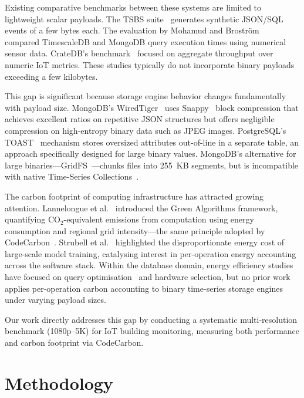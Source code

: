 \documentclass[conference]{IEEEtran}
\begin{document}
Existing comparative benchmarks between these systems are limited to lightweight scalar payloads. The TSBS suite~\cite{tsbs} generates synthetic JSON/SQL events of a few bytes each. The evaluation by Mohamud and Broström~\cite{diva_timescaledb_mongodb_eval} compared TimescaleDB and MongoDB query execution times using numerical sensor data. CrateDB's benchmark~\cite{cratedb_ts_benchmark} focused on aggregate throughput over numeric IoT metrics. These studies typically do not incorporate binary payloads exceeding a few kilobytes.

This gap is significant because storage engine behavior changes fundamentally with payload size. MongoDB's WiredTiger~\cite{mongodb_wiredtiger_storage} uses Snappy~\cite{google_snappy} block compression that achieves excellent ratios on repetitive JSON structures but offers negligible compression on high-entropy binary data such as JPEG images. PostgreSQL's TOAST~\cite{postgresql_toast_docs} mechanism stores oversized attributes out-of-line in a separate table, an approach specifically designed for large binary values. MongoDB's alternative for large binaries---GridFS~\cite{mongodb_gridfs}---chunks files into 255~KB segments, but is incompatible with native Time-Series Collections~\cite{mongodb_ts_limitations}.

The carbon footprint of computing infrastructure has attracted growing attention. Lannelongue et al.~\cite{lannelongue_green_algorithms} introduced the Green Algorithms framework, quantifying CO$_2$-equivalent emissions from computation using energy consumption and regional grid intensity---the same principle adopted by CodeCarbon~\cite{codecarbon}. Strubell et al.~\cite{strubell_energy_nlp} highlighted the disproportionate energy cost of large-scale model training, catalysing interest in per-operation energy accounting across the software stack. Within the database domain, energy efficiency studies have focused on query optimisation~\cite{nerc_tsdb_survey} and hardware selection, but no prior work applies per-operation carbon accounting to binary time-series storage engines under varying payload sizes.

Our work directly addresses this gap by conducting a systematic multi-resolution benchmark (1080p--5K) for IoT building monitoring, measuring both performance and carbon footprint via CodeCarbon.


\section{Methodology}
\label{sec:methodology}
\end{document}
